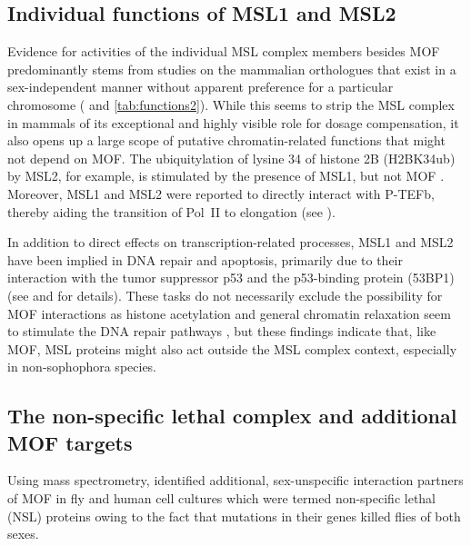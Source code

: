 \subsection{Individual functions of MSL1 and MSL2}
Evidence for activities of the individual MSL complex members besides MOF predominantly stems from studies on the mammalian orthologues that exist in a sex-independent manner without apparent preference for a particular chromosome ( and \ref{tab:functions2}). While this seems to strip the MSL complex in mammals of its exceptional and highly visible role for dosage compensation, it also opens up a large scope of putative chromatin-related functions that might not depend on MOF. The ubiquitylation of lysine 34 of histone 2B (H2BK34ub) by MSL2, for example, is stimulated by the presence of MSL1, but not MOF \citep{Wu2011}. Moreover, MSL1 and MSL2 were reported to directly interact with P-TEFb, thereby aiding the transition of Pol~II to elongation \citep{Wu2014} (see ).

In addition to direct effects on transcription-related processes, MSL1 and MSL2 have been implied in DNA repair and apoptosis, primarily due to their interaction with the tumor suppressor p53 and the p53-binding protein (53BP1) \citep{Kruse2009, Li2010, Lai2013} (see  and  for details). These tasks do not necessarily exclude the possibility for MOF interactions as histone acetylation and general chromatin relaxation seem to stimulate the DNA repair pathways \citep{Altmeyer2013}, but these findings indicate that, like MOF, MSL proteins might also act outside the MSL complex context, especially in non-sophophora species.
%
\subsection{The non-specific lethal complex and additional MOF targets}
Using mass spectrometry, \citet{Mendjan2006} identified additional, sex-unspecific interaction partners of MOF in fly and human cell cultures which were termed non-specific lethal (NSL) proteins owing to the fact that mutations in their genes killed flies of both sexes.

